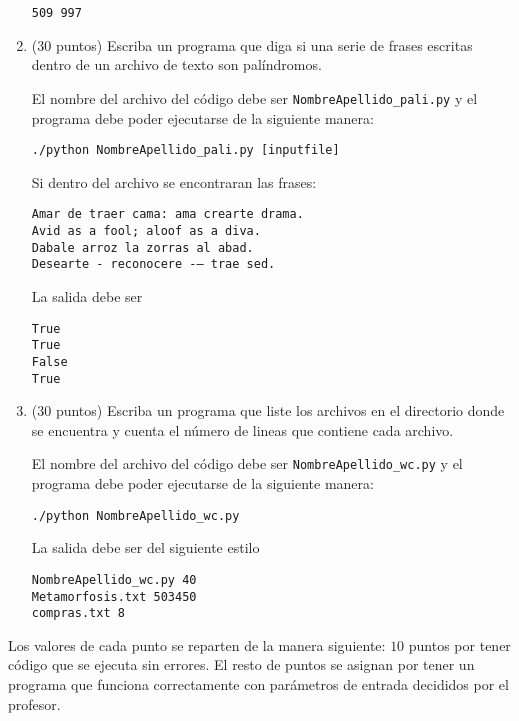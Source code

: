 \documentclass{article}
\begin{document}
\begin{enumerate}
\begin{verbatim}
509 997
\end{verbatim}

\item (30 puntos) Escriba un programa que diga si una serie de frases escritas dentro de un archivo de texto son pal\'indromos.

El nombre del archivo del c\'odigo debe ser \verb"NombreApellido_pali.py" y el programa debe poder ejecutarse de la siguiente manera:

\begin{verbatim}
./python NombreApellido_pali.py [inputfile]
\end{verbatim}

Si dentro del archivo se encontraran las frases:
\begin{verbatim}
Amar de traer cama: ama crearte drama.
Avid as a fool; aloof as a diva.
Dabale arroz la zorras al abad.
Desearte - reconocere -– trae sed.
\end{verbatim}

La salida debe ser
\begin{verbatim}
True
True
False
True
\end{verbatim}

\item (30 puntos) Escriba un programa que liste los archivos en el directorio donde se encuentra y cuenta el n\'umero de lineas que contiene cada archivo.

El nombre del archivo del c\'odigo debe ser \verb"NombreApellido_wc.py" y el programa debe poder ejecutarse de la siguiente manera:

\begin{verbatim}
./python NombreApellido_wc.py
\end{verbatim}

La salida debe ser del siguiente estilo
\begin{verbatim}
NombreApellido_wc.py 40
Metamorfosis.txt 503450
compras.txt 8
\end{verbatim}


\end{enumerate}

Los valores de cada punto se reparten de la manera siguiente: $10$ puntos por tener c\'odigo que se ejecuta sin errores. El resto de puntos se asignan por tener un programa que funciona correctamente con par\'ametros de entrada decididos por el profesor.
\end{document}

